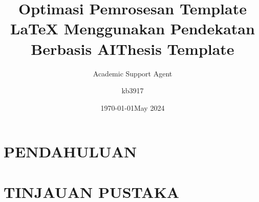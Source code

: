 \documentclass{article}
\title{Optimasi Pemrosesan Template LaTeX Menggunakan Pendekatan Berbasis AI}
\author{Academic Support Agent}
\date{\today}
\begin{document}
\maketitle

\begin{abstract}

\end{abstract}

\chapter{PENDAHULUAN}


\chapter{TINJAUAN PUSTAKA}


\usepackage{graphicx} %
\usepackage[a4paper, total={6.27in, 9.69in}]{geometry}
\renewcommand{\baselinestretch}{1.5}
\usepackage{blindtext}
\graphicspath{ {figures/} }
\usepackage{array}
\usepackage[
backend=biber,
style=authoryear  ,
sorting=ynt
]{biblatex}
\usepackage[nottoc,numbib]{tocbibind}




\title{Thesis Template}
\author{kb3917 }
\date{May 2024}
\end{document}
